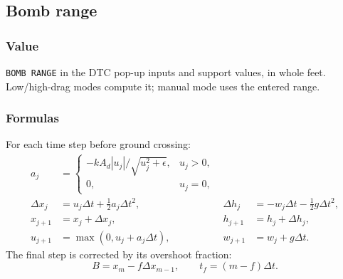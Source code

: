 \documentclass[10pt,a4paper]{amsart}
\begin{document}
\subsection{Bomb range}\label{subsec:popup-bomb}
\subsubsection*{Value}
\texttt{BOMB RANGE} in the DTC pop-up inputs and support values, in whole
feet. Low/high-drag modes compute it; manual mode uses the entered range.

\subsubsection*{Formulas}
For each time step before ground crossing:
\begin{align*}
 a_j&=\begin{cases}
 -kA_d|u_j|/\sqrt{u_j^2+\epsilon},&u_j>0,\\
 0,&u_j=0,
 \end{cases}\\
 \Delta x_j&=u_j\Delta t+\tfrac12a_j\Delta t^2,&
 \Delta h_j&=-w_j\Delta t-\tfrac12g\Delta t^2,\\
 x_{j+1}&=x_j+\Delta x_j,&h_{j+1}&=h_j+\Delta h_j,\\
 u_{j+1}&=\max(0,u_j+a_j\Delta t),&
 w_{j+1}&=w_j+g\Delta t.
\end{align*}
The final step is corrected by its overshoot fraction:
\[
 B=x_m-f\Delta x_{m-1},\qquad t_f=(m-f)\Delta t.
\]
\end{document}
